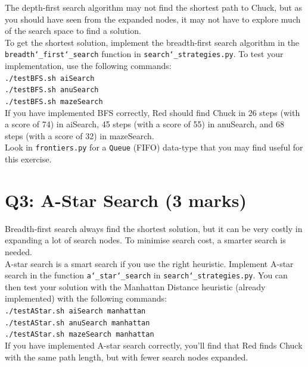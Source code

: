 \documentclass[12pt]{article}
\begin{document}
The depth-first search algorithm may not find the shortest path to Chuck, but as
you should have seen from the expanded nodes, it may not have to explore much of the
search space to find a solution.\\

To get the shortest solution, implement the breadth-first search algorithm in
the \texttt{breadth\char`_first\char`_search} function in \texttt{search\char`_strategies.py}. 
To test your implementation, use the following commands:\\

\texttt{./testBFS.sh aiSearch}\\
\indent\texttt{./testBFS.sh anuSearch}\\
\indent\texttt{./testBFS.sh mazeSearch}\\

If you have implemented BFS correctly, Red should find Chuck in 26 steps (with a score of 74) in aiSearch,
45 steps (with a score of 55) in anuSearch, and
68 steps (with a score of 32) in mazeSearch.\\

Look in \texttt{frontiers.py} for a \texttt{Queue} (FIFO) data-type that you may find useful
for this exercise.

\section{Q3: A-Star Search (3 marks)}

Breadth-first search always find the shortest solution, but it can be very costly in
expanding a lot of search nodes. To minimise search cost, a smarter search is needed.\\

A-star search is a smart search if you use the right heuristic.
Implement A-star search in the function \texttt{a\char`_star\char`_search} in \texttt{search\char`_strategies.py}.
You can then test your solution with the Manhattan Distance heuristic (already implemented) with the following commands:\\

\texttt{./testAStar.sh aiSearch manhattan}\\
\indent\texttt{./testAStar.sh anuSearch manhattan}\\
\indent\texttt{./testAStar.sh mazeSearch manhattan}\\

If you have implemented A-star search correctly, you'll find that Red finds Chuck
with the same path length, but with fewer search nodes expanded.\\
\end{document}
